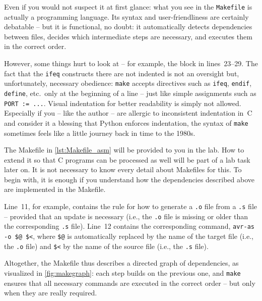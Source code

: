\documentclass[a4paper,12pt]{article}
\begin{document}
Even if you would not suspect it at first glance: what you see in the
\texttt{Makefile} is actually a programming language. Its syntax and
user-friendliness are certainly debatable – but it is functional, no doubt:
it automatically detects dependencies between files, decides which
intermediate steps are necessary, and executes them in the correct order.

However, some things hurt to look at – for example, the block in
lines~23--29. The fact that the \texttt{ifeq} constructs there are not
indented is not an oversight but, unfortunately, necessary obedience:
\texttt{make} accepts directives such as \texttt{ifeq}, \texttt{endif},
\texttt{define}, etc.\ only at the beginning of a line – just like simple
assignments such as \texttt{PORT~:=~...}. Visual indentation for better
readability is simply not allowed. Especially if you – like the author – are
allergic to inconsistent indentation in~C and consider it a blessing that
Python enforces indentation, the syntax of \texttt{make} sometimes feels
like a little journey back in time to the 1980s.


The Makefile in \autoref{lst:Makefile_asm} will be provided to you in the
lab. How to extend it so that C programs can be processed as well will be
part of a lab task later on.
It is not necessary to know every detail about Makefiles for this. To begin
with, it is enough if you understand how the dependencies described above
are implemented in the Makefile.

Line~11, for example, contains the rule for how to generate a \texttt{.o}
file from a \texttt{.s} file – provided that an update is necessary
(i.e., the \texttt{.o} file is missing or older than the corresponding
\texttt{.s} file).
Line~12 contains the corresponding command,
\texttt{avr-as -o \$@ \$<},
where \texttt{\$@} is automatically replaced by the name of the target file
(i.e., the \texttt{.o} file) and \texttt{\$<} by the name of the source file
(i.e., the \texttt{.s} file).


Altogether, the Makefile thus describes a directed graph of dependencies, as
visualized in \autoref{fig:makegraph}: each step builds on the previous one,
and \texttt{make} ensures that all necessary commands are executed in the
correct order – but only when they are really required.
\end{document}
